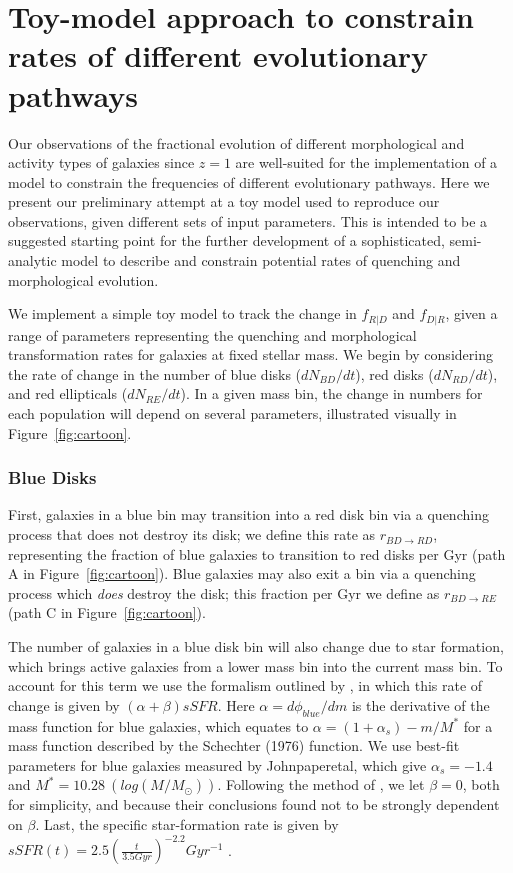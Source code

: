 \documentclass[useAMS,usenatbib]{mn2e}
\begin{document}

  


\newpage
\clearpage

\appendix

\section{Toy-model approach to constrain rates of different evolutionary pathways}

Our observations of the fractional evolution of different morphological and activity types of galaxies since $z=1$ are well-suited for the implementation of a model to constrain the frequencies of different evolutionary pathways. Here we present our preliminary attempt at a toy model used to reproduce our observations, given different sets of input parameters. This is intended to be a suggested starting point for the further development of a sophisticated, semi-analytic model to describe and constrain potential rates of quenching and morphological evolution. 

We implement a simple toy model to track the change in $f_{R|D}$ and $f_{D|R}$, given a range of parameters representing the quenching and morphological transformation rates for galaxies at fixed stellar mass. We begin by considering the rate of change in the number of blue disks ($dN_{BD}/dt$), red disks ($dN_{RD}/dt$), and red ellipticals ($dN_{RE}/dt$). In a given mass bin, the change in numbers for each population will depend on several parameters, illustrated visually in Figure~\ref{fig:cartoon}.

\subsubsection{Blue Disks}
First, galaxies in a blue bin may transition into a red disk bin via a quenching process that does not destroy its disk; we define this rate as $r_{BD \rightarrow RD}$, representing the fraction of blue galaxies to transition to red disks per Gyr (path A in Figure~\ref{fig:cartoon}). Blue galaxies may also exit a bin via a quenching process which \emph{does} destroy the disk; this fraction per Gyr we define as $r_{BD \rightarrow RE}$ (path C in Figure~\ref{fig:cartoon}).

The number of galaxies in a blue disk bin will also change due to star formation, which brings active galaxies from a lower mass bin into the current mass bin. To account for this term we use the formalism outlined by \citet{Peng2010}, in which this rate of change is given by $(\alpha + \beta)sSFR$. Here $\alpha = d\phi_{blue}/dm$ is the derivative of the mass function for blue galaxies, which equates to $\alpha = (1+\alpha_s) - m/M^*$ for a mass function described by the Schechter (1976) function. We use best-fit parameters for blue galaxies measured by Johnpaperetal, which give $\alpha_s = -1.4$ and $M^* = 10.28 ~(log(M/M_{\odot}))$. Following the method of \citet{Peng2010}, we let $\beta=0$, both for simplicity, and because their conclusions found not to be strongly dependent on $\beta$. Last, the specific star-formation rate is given by $sSFR(t) = 2.5(\frac{t}{3.5 Gyr})^{-2.2}Gyr^{-1}$ \citep{Peng2010}.
\end{document}
